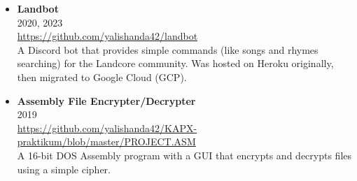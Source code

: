 \documentclass[11pt,a4paper]{article}
\begin{document}
\begin{itemize}[leftmargin=*]
    \item \textbf{Landbot} \\
    2020, 2023 \\
    \href{https://github.com/yalishanda42/landbot}{https://github.com/yalishanda42/landbot} \\
    A Discord bot that provides simple commands (like songs and rhymes searching) for the Landcore community. 
    Was hosted on Heroku originally, then migrated to Google Cloud (GCP).

    \item \textbf{Assembly File Encrypter/Decrypter} \\
    2019 \\
    \href{https://github.com/yalishanda42/KAPX-praktikum/blob/master/PROJECT.ASM}{https://github.com/yalishanda42/KAPX-praktikum/blob/master/PROJECT.ASM} \\
    A 16-bit DOS Assembly program with a GUI that encrypts and decrypts files using a simple cipher.

\end{itemize}
\end{document}
